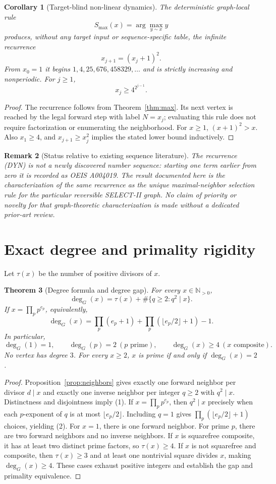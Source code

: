 \documentclass[11pt,a4paper]{article}
\newtheorem{theorem}{Theorem}[section]
\newtheorem{corollary}[theorem]{Corollary}
\newtheorem{remark}[theorem]{Remark}
\newcommand{\NN}{\mathbb N_{>0}}
\begin{document}
\begin{corollary}[Target-blind non-linear dynamics]\label{cor:dyn}
The deterministic graph-local rule
\[
 S_{\max}(x)=\arg\max_{y\sim x}y
\]
produces, without any target input or sequence-specific table, the infinite recurrence
\[
 x_{j+1}=(x_j+1)^2. \tag{DYN}
\]
From $x_0=1$ it begins $1,4,25,676,458329,\ldots$ and is strictly increasing and nonperiodic. For $j\ge1$,
\[
 x_j\ge4^{2^{j-1}}.
\]
\end{corollary}
\begin{proof}
The recurrence follows from Theorem~\ref{thm:max}. Its next vertex is reached by the legal forward step with label $N=x_j$; evaluating this rule does not require factorization or enumerating the neighborhood. For $x\ge1$, $(x+1)^2>x$. Also $x_1\ge4$, and $x_{j+1}\ge x_j^2$ implies the stated lower bound inductively.
\end{proof}

\begin{remark}[Status relative to existing sequence literature]
The recurrence (DYN) is not a newly discovered number sequence: starting one term earlier from zero it is recorded as OEIS A004019. The result documented here is the characterization of the same recurrence as the unique maximal-neighbor selection rule for the particular reversible SELECT-II graph. No claim of priority or novelty for that graph-theoretic characterization is made without a dedicated prior-art review.
\end{remark}

\section{Exact degree and primality rigidity}
Let $\tau(x)$ be the number of positive divisors of $x$.
\begin{theorem}[Degree formula and degree gap]\label{thm:deg}
For every $x\in\NN$,
\[
\boxed{\deg_G(x)=\tau(x)+\#\{q\ge2:q^2\mid x\}.} \tag{1}
\]
If $x=\prod_p p^{e_p}$, equivalently,
\[
\boxed{\deg_G(x)=\prod_p(e_p+1)+\prod_p\left(\lfloor e_p/2\rfloor+1\right)-1.} \tag{2}
\]
In particular,
\[
\deg_G(1)=1,\qquad \deg_G(p)=2\ (p\text{ prime}),\qquad
\deg_G(x)\ge4\ (x\text{ composite}).
\]
No vertex has degree $3$. For every $x\ge2$, $x$ is prime if and only if $\deg_G(x)=2$.
\end{theorem}
\begin{proof}
Proposition~\ref{prop:neighbors} gives exactly one forward neighbor per divisor $d\mid x$ and exactly one inverse neighbor per integer $q\ge2$ with $q^2\mid x$. Distinctness and disjointness imply (1). If $x=\prod_p p^{e_p}$, then $q^2\mid x$ precisely when each $p$-exponent of $q$ is at most $\lfloor e_p/2\rfloor$. Including $q=1$ gives $\prod_p(\lfloor e_p/2\rfloor+1)$ choices, yielding (2).
For $x=1$, there is one forward neighbor. For prime $p$, there are two forward neighbors and no inverse neighbors. If $x$ is squarefree composite, it has at least two distinct prime factors, so $\tau(x)\ge4$. If $x$ is not squarefree and composite, then $\tau(x)\ge3$ and at least one nontrivial square divides $x$, making $\deg_G(x)\ge4$. These cases exhaust positive integers and establish the gap and primality equivalence.
\end{proof}
\end{document}
